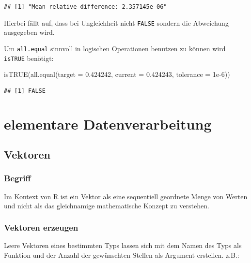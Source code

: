 \documentclass[
]{book}
\newenvironment{Shaded}{\begin{snugshade}}{\end{snugshade}}
\newcommand{\AttributeTok}[1]{\textcolor[rgb]{0.77,0.63,0.00}{#1}}
\newcommand{\FloatTok}[1]{\textcolor[rgb]{0.00,0.00,0.81}{#1}}
\newcommand{\FunctionTok}[1]{\textcolor[rgb]{0.00,0.00,0.00}{#1}}
\newcommand{\NormalTok}[1]{#1}
\begin{document}
\begin{verbatim}
## [1] "Mean relative difference: 2.357145e-06"
\end{verbatim}

Hierbei fällt auf, dass bei Ungleichheit nicht \texttt{FALSE} sondern die Abweichung ausgegeben wird.

Um \texttt{all.equal} sinnvoll in logischen Operationen benutzen zu können wird \texttt{isTRUE} benötigt:

\begin{Shaded}
\begin{Highlighting}[]
\FunctionTok{isTRUE}\NormalTok{(}\FunctionTok{all.equal}\NormalTok{(}\AttributeTok{target =} \FloatTok{0.424242}\NormalTok{,}
                 \AttributeTok{current =} \FloatTok{0.424243}\NormalTok{,}
                 \AttributeTok{tolerance =} \FloatTok{1e{-}6}\NormalTok{))}
\end{Highlighting}
\end{Shaded}

\begin{verbatim}
## [1] FALSE
\end{verbatim}

\hypertarget{elementare-datenverarbeitung}{%
\chapter{elementare Datenverarbeitung}\label{elementare-datenverarbeitung}}

\hypertarget{vektoren}{%
\section{Vektoren}\label{vektoren}}

\hypertarget{begriff}{%
\subsection{Begriff}\label{begriff}}

Im Kontext von R ist ein Vektor als eine sequentiell geordnete Menge von Werten und nicht als das gleichnamige mathematische Konzept zu verstehen.

\hypertarget{vektoren-erzeugen}{%
\subsection{Vektoren erzeugen}\label{vektoren-erzeugen}}

Leere Vektoren eines bestimmten Typs lassen sich mit dem Namen des Typs als Funktion und der Anzahl der gewünschten Stellen als Argument erstellen. z.B.:
\end{document}
